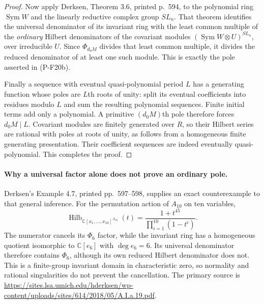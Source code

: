 \begin{proof}
Now apply Derksen, Theorem 3.6, printed p.~594, to the polynomial
ring $\operatorname{Sym}W$ and the linearly reductive complex group
$SL_n$. That theorem identifies the universal denominator of
its invariant ring with the least common multiple of the
\emph{ordinary} Hilbert denominators of the covariant modules
$(\operatorname{Sym}W\otimes U)^{SL_n}$, over irreducible $U$.
Since $\Phi_{d_0M}$ divides that least common multiple, it divides
the reduced denominator of at least one such module. This is
exactly the pole asserted in (P-F20b).

Finally a sequence with eventual quasi-polynomial period $L$
has a generating function whose poles are $L$th roots of unity:
split its eventual coefficients into residues modulo $L$ and
sum the resulting polynomial sequences. Finite initial terms
add only a polynomial. A primitive $(d_0M)$th pole therefore
forces $d_0M\mid L$. Covariant modules are finitely generated
over $R$, so their Hilbert series are rational with poles at
roots of unity, as follows from a homogeneous finite generating
presentation. Their coefficient sequences are indeed eventually
quasi-polynomial. This completes the proof.
\end{proof}

\paragraph{Why a universal factor alone does not prove an ordinary pole.}
Derksen's Example 4.7, printed pp.~597--598, supplies an exact
counterexample to that general inference. For the permutation action
of $A_{10}$ on ten variables,
\[
 \operatorname{Hilb}_{\mathbb C[x_1,\ldots,x_{10}]^{A_{10}}}(t)
   =\frac{1+t^{45}}{\prod_{i=1}^{10}(1-t^i)}.
\]
The numerator cancels its $\Phi_6$ factor, while the invariant
ring has a homogeneous quotient isomorphic to $\mathbb C[e_6]$
with $\deg e_6=6$. Its universal denominator therefore contains
$\Phi_6$, although its own reduced Hilbert denominator does not.
This is a finite-group invariant domain in characteristic zero,
so normality and rational singularities do not prevent the
cancellation. The primary source is
\url{https://sites.lsa.umich.edu/hderksen/wp-content/uploads/sites/614/2018/05/A.I.a.19.pdf}.

